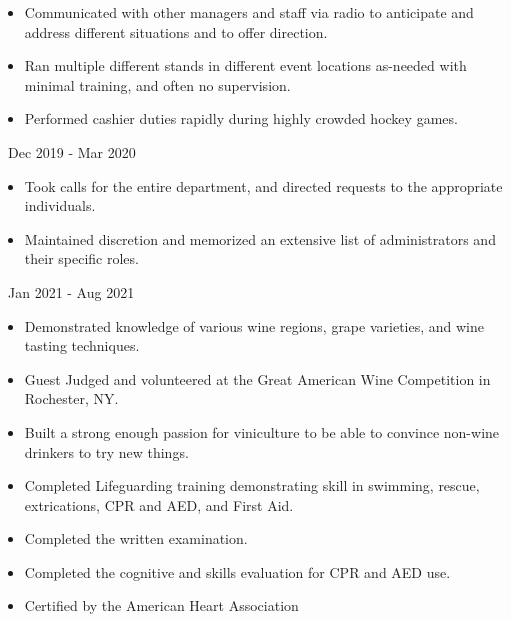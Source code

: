 \documentclass[11pt,letterpaper,ragged2e]{altacv}
\begin{document}
{
	\begin{itemize}
		\item{Communicated with other managers and staff via radio to anticipate and address different situations and to offer direction.}
		\item{Ran multiple different stands in different event locations as-needed with minimal training, and often no supervision.}
		\item{Performed cashier duties rapidly during highly crowded hockey games.}
	\end{itemize}
}
{\faCalendar\, Dec 2019 - Mar 2020}
{
}

{
	\begin{itemize}
		\item{Took calls for the entire department, and directed requests to the appropriate individuals.}
		\item{Maintained discretion and memorized an extensive list of administrators and their specific roles.}
	\end{itemize}
}
{\faCalendar\, Jan 2021 - Aug 2021}
{
}



{
	\begin{itemize}
		\item{Demonstrated knowledge of various wine regions, grape varieties, and wine tasting techniques.}
		\item{Guest Judged and volunteered at the Great American Wine Competition in Rochester, NY.}
		\item{Built a strong enough passion for viniculture to be able to convince non-wine drinkers to try new things.}
	\end{itemize}
}
{
}

{
	\begin{itemize}
		\item{Completed Lifeguarding training demonstrating skill in swimming, rescue, extrications, CPR and AED, and  First Aid.}
		\item{Completed the written examination.}
	\end{itemize}
}
{
}

{
	\begin{itemize}
		\item{Completed the cognitive and skills evaluation for CPR and AED use.}
		\item{Certified by the American Heart Association}
	\end{itemize}
}
{
}


\clearpage

\nocite{*}
\end{document}
